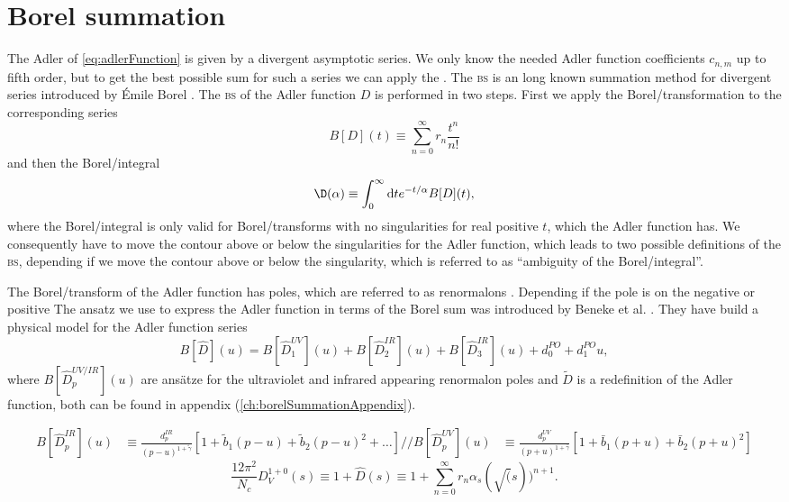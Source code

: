 \documentclass[../../index.tex]{subfiles}
\begin{document}
\section{Borel summation}
The Adler of \cref{eq:adlerFunction} is given by a divergent asymptotic series.
We only know the needed Adler function coefficients \(c_{n,m}\) up to fifth
order, but to get the best possible sum for such a series we can apply the
. The \textsc{bs} is an long known summation method
for divergent series introduced by Émile Borel \cite{Emile1899}. The \textsc{bs}
of the Adler function \(D\) is performed in two steps. First we apply the
Borel\-/transformation to the corresponding series
\begin{equation}
  B[D](t) \equiv \sum_{n=0}^{\infty} r_n \frac{t^n}{n!}
\end{equation}
and then the Borel\-/integral
\begin{equation}
  \D(\alpha) \equiv \int_0^\infty \dif t e^{-t/\alpha} B[D](t),
\end{equation}
where the Borel\-/integral is only valid for Borel\-/transforms with no
singularities for real positive \(t\), which the Adler function has. We
consequently have to move the contour above or below the singularities for the
Adler function, which leads to two possible definitions of the \textsc{bs},
depending if we move the contour above or below the singularity, which is
referred to as ``ambiguity of the Borel\-/integral''.

The Borel\-/transform of the Adler function has poles, which are referred to as
renormalons \cite{Beneke1999, Zichichi1979}. Depending if the pole is on the negative or positive 
The ansatz we use to express the Adler function in terms of the Borel sum was
introduced by Beneke et al. \cite{2008}. They have build a physical model for
the Adler function series
\begin{equation}
  B[\widehat D](u) = B[\widehat D_1^{UV}](u) + B[\widehat D_2^{IR}](u) + B[\widehat D_3^{IR}](u) + d_0^{PO} + d_1^{PO}u,
\end{equation}
where \(B[\widehat D_p^{UV/IR}](u)\) are ansätze for the ultraviolet and
infrared appearing renormalon poles and \(\widetilde D\) is a redefinition of
the Adler function, both can be found in appendix (\cref{ch:borelSummationAppendix}).

\begin{align}
  B[\widehat D_p^{IR}](u) &\equiv \frac{d_p^{IR}}{(p-u)^{1+\tilde \gamma}}
                            \left[  1 + \tilde b_1(p-u) + \tilde b_2(p-u)^2 + \dots \right]//
                            B[\widehat D_p^{UV}](u) &\equiv \frac{d_p^{UV}}{(p+u)^{1+\bar\gamma}}\left[1 + \bar b_1(p+u) + \bar b_2(p+u)^2 \right]
\end{align}
\begin{equation}
  \frac{12 \pi^2}{N_c} D_V^{1+0}(s) \equiv 1 + \widehat D(s) \equiv 1 + \sum_{n=0}^{\infty} r_n \alpha_s(\sqrt(s))^{n+1}.
\end{equation}
\end{document}
